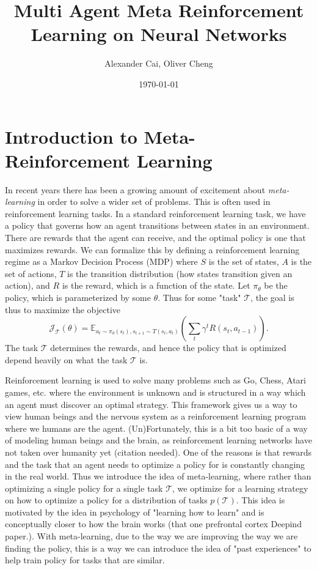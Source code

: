 \documentclass[11pt,letterpaper]{article}
\author{Alexander Cai, Oliver Cheng}
\date{\today}
\title{Multi Agent Meta Reinforcement Learning on Neural Networks}
\begin{document}
\maketitle
\section{Introduction to Meta-Reinforcement Learning}
In recent years there has been a growing amount of excitement about 
\textit{meta-learning} in order to solve a wider set of problems. This is 
often used in reinforcement learning tasks. In a standard reinforcement
 learning task, we have a policy that governs how an agent transitions 
between states in an environment. There are rewards that the agent can 
receive, and the optimal policy is one that maximizes rewards. We can 
formalize this by defining a reinforcement learning regime as a Markov 
Decision Process (MDP) where $S$ is the set of states, $A$ is the set 
of actions, $T$ is the transition distribution (how states transition given 
an action), and $R$ is the reward, which is a function of the state. Let 
$\pi_\theta$ be the policy, which is parameterized by some $\theta$. 
Thus for some "task" $\mathcal{T}$, the goal is thus to maximize the objective 
\[ \mathcal{J}_{\mathcal{T}}(\theta) = \mathbb{E}_{a_t \sim \pi_\theta(s_t), s_{t+1}
 \sim T(s_t, a_t)} \left( \sum_t \gamma^t R(s_t, a_{t-1}) \right).\]
The task $\mathcal{T}$ determines the rewards, and hence the policy that is optimized 
depend heavily on what the task $\mathcal{T}$ is. 

Reinforcement learning is used to solve many problems such as Go, Chess, 
Atari games, etc. where the environment is unknown and is structured in 
a way which an agent must discover an optimal strategy. This framework 
gives us a way to view human beings and the nervous system as a 
reinforcement learning program where we humans are the agent. 
(Un)Fortunately, this is a bit too basic of a way of modeling human 
beings and the brain, as reinforcement learning networks have not taken 
over humanity yet (citation needed). One of the reasons is that rewards 
and the task that an agent needs to optimize a policy for is constantly 
changing in the real world. Thus we introduce the idea of meta-learning, 
where rather than optimizing a single policy for a single task $\mathcal{T}$, 
we optimize for a learning strategy on how to optimize a policy for a distribution 
of tasks $p(\mathcal{T})$. This idea is motivated by the idea in psychology of 
 "learning how to learn" and is conceptually closer to how the brain 
works (that one prefrontal cortex Deepind paper.). With meta-learning, due to
the way we are improving the way we are finding the policy, this is a way
we can introduce the idea of "past experiences" to help train policy for 
tasks that are similar.
\end{document}
